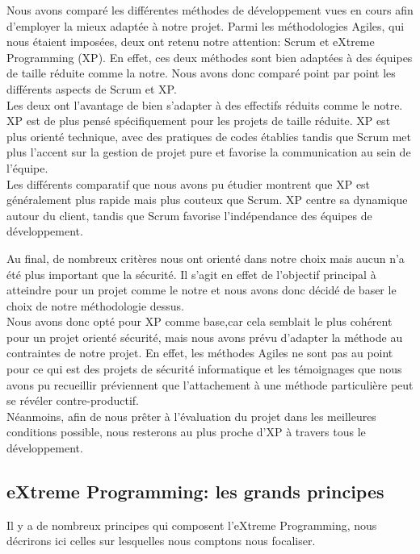 \documentclass{../../res/univ-projet}
\begin{document}
	Nous avons comparé les différentes méthodes de développement vues en cours afin d'employer la mieux adaptée à notre projet. Parmi les méthodologies Agiles, qui nous étaient imposées, deux ont retenu notre attention: Scrum et eXtreme Programming (XP). En effet, ces deux méthodes sont bien adaptées à des équipes de taille réduite comme la notre. Nous avons donc comparé point par point les différents aspects de Scrum et XP.	
\\

		Les deux ont l'avantage de bien s'adapter à des effectifs réduits comme le notre. XP est de plus pensé spécifiquement pour les projets de taille réduite. XP est plus orienté technique, avec des pratiques de codes établies tandis que Scrum met plus l'accent sur la gestion de projet pure et favorise la communication au sein de l'équipe.\\
		
		
		Les différents comparatif que nous avons pu étudier montrent que XP est généralement plus rapide mais plus couteux que Scrum. XP centre sa dynamique autour du client, tandis que Scrum favorise l'indépendance des équipes de développement.
	
	Au final, de nombreux critères nous ont orienté dans notre choix mais aucun n'a été plus important que la sécurité. Il s'agit en effet de l'objectif principal à atteindre pour un projet comme le notre et nous avons donc décidé de baser le choix de notre méthodologie dessus.
\\
		
	Nous avons donc opté pour XP comme base,car cela semblait le plus cohérent pour un projet orienté sécurité, mais nous avons prévu d'adapter la méthode au contraintes de notre projet. En effet, les méthodes Agiles ne sont pas au point pour ce qui est des projets de sécurité informatique et les témoignages que nous avons pu recueillir préviennent que l'attachement à une méthode particulière peut se révéler contre-productif. 
\\


	Néanmoins, afin de nous prêter à l'évaluation du projet dans les meilleures conditions possible, nous resterons au plus proche d'XP à travers tous le développement.
	

\subsection{eXtreme Programming: les grands principes}

Il y a de nombreux principes qui composent l'eXtreme Programming, nous décrirons ici celles sur lesquelles nous comptons nous focaliser.
\end{document}
